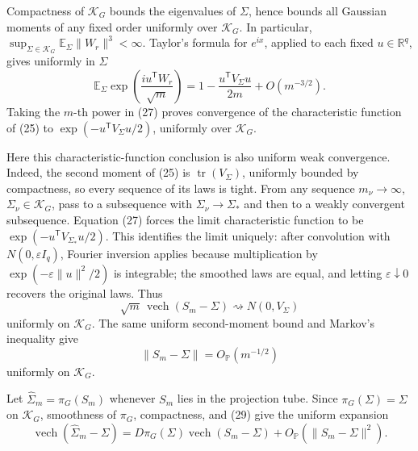 Compactness of \(\mathcal K_G\) bounds the eigenvalues of \(\Sigma\), hence bounds all Gaussian moments of any fixed order uniformly over \(\mathcal K_G\).  In particular, \(\sup_{\Sigma\in\mathcal K_G}\mathbb E_\Sigma\|W_r\|^3<\infty\).  Taylor's formula for \(e^{ix}\), applied to each fixed \(u\in\mathbb R^q\), gives uniformly in \(\Sigma\)
\[
 \mathbb E_\Sigma
 \exp\!\left(\frac{i u^{\mathsf T}W_r}{\sqrt m}\right)
 =1-\frac{u^{\mathsf T}V_\Sigma u}{2m}+O(m^{-3/2}).            \tag{27}
\]
Taking the \(m\)-th power in (27) proves convergence of the characteristic function of (25) to
\(\exp(-u^{\mathsf T}V_\Sigma u/2)\), uniformly over \(\mathcal K_G\).

Here this characteristic-function conclusion is also uniform weak convergence.  Indeed, the second moment of (25) is \(\operatorname{tr}(V_\Sigma)\), uniformly bounded by compactness, so every sequence of its laws is tight.  From any sequence \(m_\nu\to\infty\), \(\Sigma_\nu\in\mathcal K_G\), pass to a subsequence with \(\Sigma_\nu\to\Sigma_*\) and then to a weakly convergent subsequence.  Equation (27) forces the limit characteristic function to be \(\exp(-u^{\mathsf T}V_{\Sigma_*}u/2)\).  This identifies the limit uniquely: after convolution with \(N(0,\varepsilon I_q)\), Fourier inversion applies because multiplication by \(\exp(-\varepsilon\|u\|^2/2)\) is integrable; the smoothed laws are equal, and letting \(\varepsilon\downarrow0\) recovers the original laws.  Thus
\[
 \sqrt m\,\operatorname{vech}(S_m-\Sigma)
 \rightsquigarrow N(0,V_\Sigma)                                \tag{28}
\]
uniformly on \(\mathcal K_G\).  The same uniform second-moment bound and Markov's inequality give
\[
 \|S_m-\Sigma\|=O_{\mathbb P}(m^{-1/2})                        \tag{29}
\]
uniformly on \(\mathcal K_G\).

Let \(\widehat\Sigma_m=\pi_G(S_m)\) whenever \(S_m\) lies in the projection tube.  Since \(\pi_G(\Sigma)=\Sigma\) on \(\mathcal K_G\), smoothness of \(\pi_G\), compactness, and (29) give the uniform expansion
\[
 \operatorname{vech}(\widehat\Sigma_m-\Sigma)
 =D\pi_G(\Sigma)\operatorname{vech}(S_m-\Sigma)
  +O_{\mathbb P}(\|S_m-\Sigma\|^2).                            \tag{30}
\]

